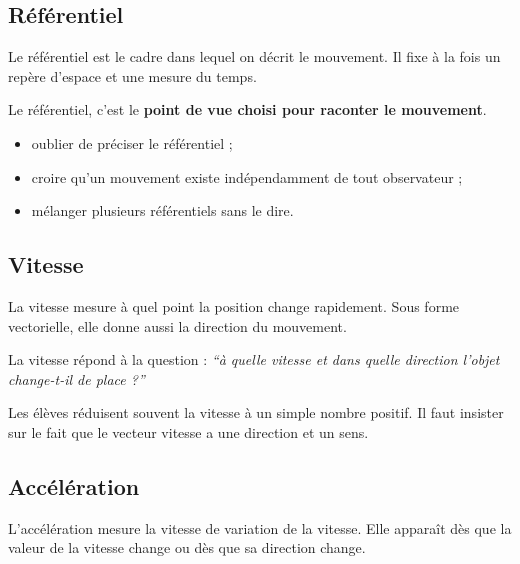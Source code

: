 \documentclass[11pt,a4paper]{article}
\begin{document}
\subsection{Référentiel}

\begin{sens}
Le référentiel est le cadre dans lequel on décrit le mouvement.
Il fixe à la fois un repère d'espace et une mesure du temps.
\end{sens}

\begin{imagem}
Le référentiel, c'est le \textbf{point de vue choisi pour raconter le mouvement}.
\end{imagem}

\begin{erreurs}
\begin{itemize}
    \item oublier de préciser le référentiel ;
    \item croire qu'un mouvement existe indépendamment de tout observateur ;
    \item mélanger plusieurs référentiels sans le dire.
\end{itemize}
\end{erreurs}

\subsection{Vitesse}

\begin{sens}
La vitesse mesure à quel point la position change rapidement.
Sous forme vectorielle, elle donne aussi la direction du mouvement.
\end{sens}

\begin{imagem}
La vitesse répond à la question :
\textit{``à quelle vitesse et dans quelle direction l'objet change-t-il de place ?''}
\end{imagem}

\begin{fausseintuition}
Les élèves réduisent souvent la vitesse à un simple nombre positif.
Il faut insister sur le fait que le vecteur vitesse a une direction et un sens.
\end{fausseintuition}

\subsection{Accélération}

\begin{sens}
L'accélération mesure la vitesse de variation de la vitesse.
Elle apparaît dès que la valeur de la vitesse change ou dès que sa direction change.
\end{sens}
\end{document}
